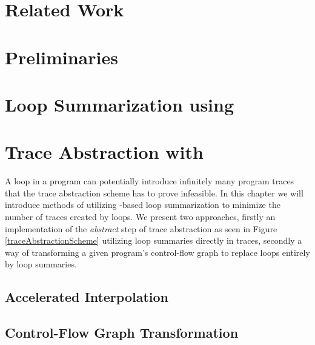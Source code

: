 \documentclass[11pt,
a4paper,
parskip=half, %
BCOR=10mm, %
ngerman, english
]{scrbook}
\begin{document}
\chapter{Related Work}
\label{relWork}

\pagebreak

\chapter{Preliminaries}
\label{background}


\chapter{Loop Summarization using \qvasr}
\label{qvasr}


\begin{comment}
	\section{Extension to \qvasrs}
	\label{qvasrs}
	
\end{comment}

\chapter{Trace Abstraction with \qvasr}
A loop in a program can potentially introduce infinitely many program traces that the trace abstraction scheme has to prove infeasible. In this chapter we will introduce methods of utilizing \qvasr-based loop summarization to minimize the number of traces created by loops. We present two approaches, firstly an implementation of the \textsl{abstract} step of trace abstraction as seen in Figure \ref{traceAbstractionScheme} utilizing loop summaries directly in traces, secondly a way of transforming a given program's control-flow graph to replace loops entirely by loop summaries.
\label{qvasrAbstracion}
\section{Accelerated Interpolation}

\label{accelInterpol}

\section{Control-Flow Graph Transformation}

\label{icfgTransformation}
\end{document}
